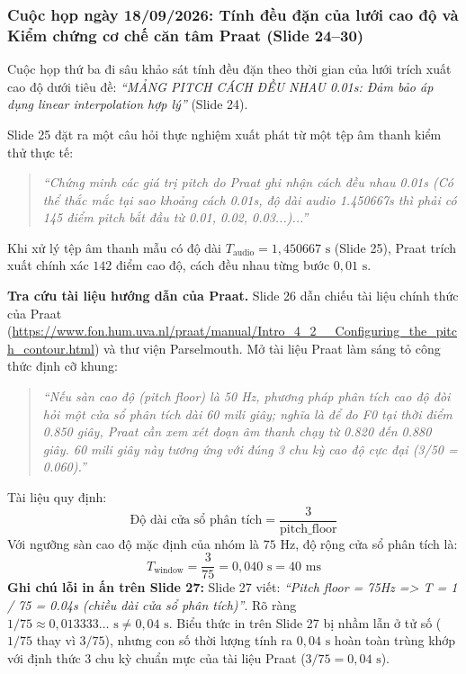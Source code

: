 \documentclass[11pt,a4paper]{article}
\begin{document}
\subsubsection*{Cuộc họp ngày 18/09/2026: Tính đều đặn của lưới cao độ và Kiểm chứng cơ chế căn tâm Praat (Slide 24--30)}

Cuộc họp thứ ba đi sâu khảo sát tính đều đặn theo thời gian của lưới trích xuất cao độ dưới tiêu đề: \textit{``MẢNG PITCH CÁCH ĐỀU NHAU 0.01s: Đảm bảo áp dụng linear interpolation hợp lý''} (Slide 24).

Slide 25 đặt ra một câu hỏi thực nghiệm xuất phát từ một tệp âm thanh kiểm thử thực tế:
\begin{quote}
\textit{``Chứng minh các giá trị pitch do Praat ghi nhận cách đều nhau 0.01s (Có thể thắc mắc tại sao khoảng cách 0.01s, độ dài audio 1.450667s thì phải có 145 điểm pitch bắt đầu từ 0.01, 0.02, 0.03...)...''}
\end{quote}
Khi xử lý tệp âm thanh mẫu có độ dài $T_{\text{audio}} = 1{,}450667\text{ s}$ (Slide 25), Praat trích xuất chính xác $142$ điểm cao độ, cách đều nhau từng bước $0{,}01\text{ s}$.

\textbf{Tra cứu tài liệu hướng dẫn của Praat.} Slide 26 dẫn chiếu tài liệu chính thức của Praat (\url{https://www.fon.hum.uva.nl/praat/manual/Intro_4_2__Configuring_the_pitch_contour.html}) và thư viện Parselmouth. Mở tài liệu Praat làm sáng tỏ công thức định cỡ khung:
\begin{quote}
\textit{``Nếu sàn cao độ (pitch floor) là 50 Hz, phương pháp phân tích cao độ đòi hỏi một cửa sổ phân tích dài 60 mili giây; nghĩa là để đo F0 tại thời điểm 0.850 giây, Praat cần xem xét đoạn âm thanh chạy từ 0.820 đến 0.880 giây. 60 mili giây này tương ứng với đúng 3 chu kỳ cao độ cực đại (3/50 = 0.060).''}
\end{quote}
Tài liệu quy định:
\begin{equation}
\text{Độ dài cửa sổ phân tích} = \frac{3}{\text{pitch\_floor}}
\end{equation}
Với ngưỡng sàn cao độ mặc định của nhóm là $75\text{ Hz}$, độ rộng cửa sổ phân tích là:
\begin{equation}
T_{\text{window}} = \frac{3}{75} = 0{,}040\text{ s} = 40\text{ ms}
\end{equation}
\textbf{Ghi chú lỗi in ấn trên Slide 27:} Slide 27 viết: \textit{``Pitch floor = 75Hz => T = 1 / 75 = 0.04s (chiều dài cửa sổ phân tích)''}. Rõ ràng $1 / 75 \approx 0{,}013333\dots\text{ s} \ne 0{,}04\text{ s}$. Biểu thức in trên Slide 27 bị nhầm lẫn ở tử số ($1/75$ thay vì $3/75$), nhưng con số thời lượng tính ra $0{,}04\text{ s}$ hoàn toàn trùng khớp với định thức 3 chu kỳ chuẩn mực của tài liệu Praat ($3/75 = 0{,}04\text{ s}$).
\end{document}
